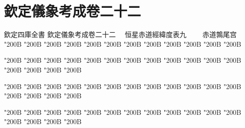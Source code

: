 \chapter*{欽定儀象考成卷二十二}
\begin{正文}
欽定四庫全書
欽定儀象考成卷二十二
　恒星赤道經緯度表九
　　赤道鶉尾宫
\char"200B\relax{}
\char"200B\relax{}
\char"200B\relax{}
\char"200B\relax{}
\char"200B\relax{}
\char"200B\relax{}
\char"200B\relax{}
\char"200B\relax{}
\char"200B\relax{}
\char"200B\relax{}
\char"200B\relax{}
\char"200B\relax
\par
\end{正文}\clearpage
{}
\begin{正文}
\char"200B\relax{}
\char"200B\relax{}
\char"200B\relax{}
\char"200B\relax{}
\char"200B\relax{}
\char"200B\relax{}
\char"200B\relax{}
\char"200B\relax{}
\char"200B\relax{}
\char"200B\relax{}
\char"200B\relax{}
\char"200B\relax{}
\char"200B\relax{}
\char"200B\relax{}
\char"200B\relax{}
\char"200B\relax
{}\par
\end{正文}\clearpage
{}
\begin{正文}
\char"200B\relax{}
\char"200B\relax{}
\char"200B\relax{}
\char"200B\relax{}
\char"200B\relax{}
\char"200B\relax{}
\char"200B\relax{}
\char"200B\relax{}
\char"200B\relax{}
\char"200B\relax{}
\char"200B\relax{}
\char"200B\relax{}
\char"200B\relax{}
\char"200B\relax{}
\char"200B\relax{}
\char"200B\relax
{}\par
\end{正文}\clearpage
{}
\begin{正文}
\char"200B\relax{}
\char"200B\relax{}
\char"200B\relax{}
\char"200B\relax{}
\char"200B\relax{}
\char"200B\relax{}
\char"200B\relax{}
\char"200B\relax{}
\char"200B\relax{}
\char"200B\relax{}
\char"200B\relax{}
\char"200B\relax{}
\char"200B\relax{}
\char"200B\relax{}
\char"200B\relax{}
\char"200B\relax
{}\par
\end{正文}\clearpage
